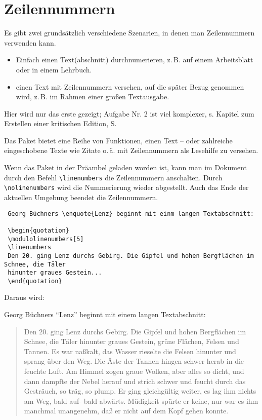 \section{Zeilennummern} 
\label{zeilennummer}

Es gibt zwei grundsätzlich verschiedene Szenarien, in denen man Zeilennummern verwenden
kann. 

\begin{itemize}
 \item Einfach einen Text(abschnitt) durchnumerieren, z.\,B. auf einem Arbeitsblatt oder in
 einem Lehrbuch.
 \item einen Text mit Zeilennummern versehen, auf die später Bezug genommen wird, 
 z.\,B. im Rahmen einer großen Textausgabe. 
\end{itemize}

Hier wird nur das erste gezeigt;
Aufgabe Nr. 2 ist viel komplexer, s. Kapitel zum Erstellen einer kritischen Edition, 
S.~\pageref{reledmac} 

Das Paket  bietet eine Reihe von Funktionen, einen Text -- oder 
zahlreiche eingeschobene Texte wie Zitate o.\,ä. mit Zeilennummern als Lesehilfe zu 
versehen.



Wenn das Paket  in der Präambel geladen worden ist, kann man im
Dokument durch den Befehl \lstinline/\linenumbers/ die Zeilennummern anschalten.
Durch \lstinline/\nolinenumbers/ wird die Nummerierung wieder abgestellt.
Auch das Ende der aktuellen Umgebung beendet die Zeilennummern.

\begin{lstlisting}
 Georg Büchners \enquote{Lenz} beginnt mit einm langen Textabschnitt:
 
 \begin{quotation}
 \modulolinenumbers[5]
 \linenumbers
 Den 20. ging Lenz durchs Gebirg. Die Gipfel und hohen Bergflächen im Schnee, die Täler
 hinunter graues Gestein...
 \end{quotation}
\end{lstlisting}

Daraus wird:
\bigskip

 Georg Büchners \enquote{Lenz} beginnt mit einem langen Textabschnitt:

 \begin{quotation}
 \modulolinenumbers[5]
 \linenumbers
 Den 20. ging Lenz durchs Gebirg. Die Gipfel und hohen Bergflächen im Schnee, die Täler
 hinunter graues Gestein, grüne Flächen, Felsen und Tannen. Es war naßkalt, das Wasser
 rieselte die Felsen hinunter und sprang über den Weg. Die Äste der Tannen hingen schwer
 herab in die feuchte Luft. Am Himmel zogen graue Wolken, aber alles so dicht, und dann 
 dampfte der Nebel herauf und strich schwer und feucht durch das Gesträuch, so träg,
 so plump. Er ging gleichgültig weiter, es lag ihm nichts am Weg, bald auf- bald
 abwärts. Müdigkeit spürte er keine, nur war es ihm manchmal unangenehm, daß er nicht
 auf dem Kopf gehen konnte.
 \end{quotation}

